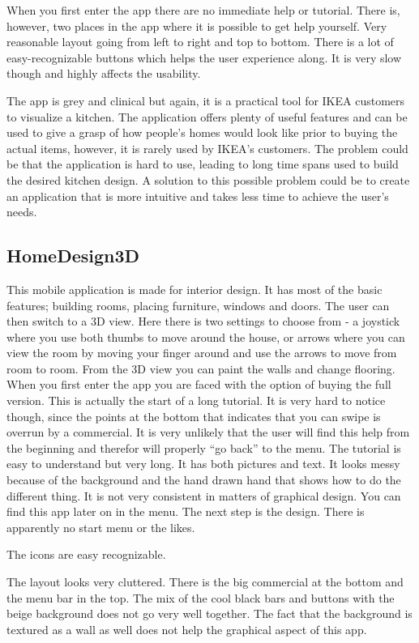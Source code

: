 When you first enter the app there are no immediate help or tutorial. There is, however, two places in the app where it is possible to get help yourself. Very reasonable layout going from left to right and top to bottom.  There is a lot of easy-recognizable buttons which helps the user experience along. 
It is very slow though and highly affects the usability. 


The app is grey and clinical but again, it is a practical tool for IKEA customers to visualize a kitchen. 
The application offers plenty of useful features and can be used to give a grasp of how people’s homes would look like prior to buying the actual items, however, it is rarely used by IKEA’s customers. The problem could be that the application is hard to use, leading to long time spans used to build the desired kitchen design. A solution to this possible problem could be to create an application that is more intuitive and takes less time to achieve the user’s needs.

\subsection{HomeDesign3D}
This mobile application is made for interior design. It has most of the basic features; building rooms, placing furniture, windows and doors. The user can then switch to a 3D view. Here there is two settings to choose from - a joystick where you use both thumbs to move around the house, or arrows where you can view the room by moving your finger around and use the arrows to move from room to room. From the 3D view you can paint the walls and change flooring.
When you first enter the app you are faced with the option of buying the full version. This is actually the start of a long tutorial. It is very hard to notice though, since the points at the bottom that indicates that you can swipe is overrun by a commercial. It is very unlikely that the user will find this help from the beginning and therefor will properly “go back” to the menu. The tutorial is easy to understand but very long. It has both pictures and text. It looks messy because of the background and the hand drawn hand that shows how to do the different thing. It is not very consistent in matters of graphical design. 
You can find this app later on in the menu. 
The next step is the design. There is apparently no start menu or the likes. 

The icons are easy recognizable.  

The layout looks very cluttered. There is the big commercial at the bottom and the menu bar in the top. 
The mix of the cool black bars and buttons with the beige background does not go very well together. The fact that the background is textured as a wall as well does not help the graphical aspect of this app. 

